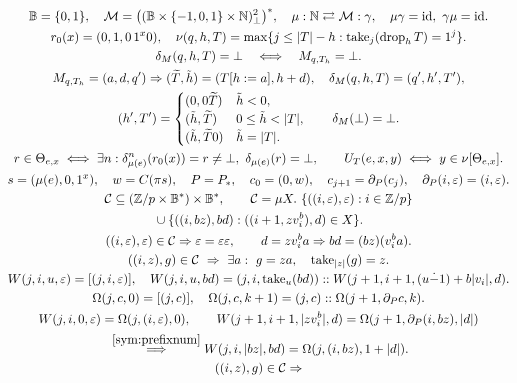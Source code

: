 \begin{gather}
\mathbb B=\{0,1\},\quad
\mathcal M=\bigl((\mathbb B\times\{-1,0,1\}\times\mathbb N)_\bot^2\bigr)^*,\quad
\mu:\mathbb N\rightleftarrows\mathcal M:\gamma,\quad
 \mu\gamma=\mathrm{id},\ \gamma\mu=\mathrm{id}.\\
r_0(x)=(0,1,0\,1^x0),\quad
\nu(q,h,T)=\max\{j\le |T|-h:\operatorname{take}_j(\operatorname{drop}_h T)=1^j\}.\\
\delta_M(q,h,T)=\bot\quad\Longleftrightarrow\quad M_{q,T_h}=\bot.\notag\\
M_{q,T_h}=(a,d,q')\Rightarrow
 (\widetilde{T},\tilde h)=(T[h:=a],h+d),\quad
 \delta_M(q,h,T)=(q',h',T'),\\
(h',T')=\begin{cases}
(0,0\widetilde T)&\tilde h<0,\\
(\tilde h,\widetilde T)&0\le\tilde h<|T|,\\
(\tilde h,\widetilde T0)&\tilde h=|T|.
\end{cases}\qquad \delta_M(\bot)=\bot .\\
r\in\Theta_{e,x}\iff\exists n:\delta_{\mu(e)}^n(r_0(x))=r\ne\bot,\
\delta_{\mu(e)}(r)=\bot,\qquad U_T(e,x,y)\iff y\in\nu[\Theta_{e,x}].\label{sym:terminalnum}\\
s=(\mu(e),0,1^x),\quad w=C(\pi s),\quad P=P_*,\quad c_0=(0,w),\quad
 c_{j+1}=\partial_P(c_j),\quad \partial_P(i,\eps)=(i,\eps).\\
\mathcal C\subseteq(\mathbb Z/p\times\mathbb B^*)\times\mathbb B^*,\qquad
\mathcal C=\mu X.\ \{((i,\eps),\eps):i\in\mathbb Z/p\}\\
{}\cup\{((i,bz),bd):((i+1,zv_i^b),d)\in X\}.\notag\\
((i,\eps),\eps)\in\mathcal C\Rightarrow \eps=\eps\eps,\qquad
d=zv_i^b a\Rightarrow bd=(bz)(v_i^b a).\\
((i,z),g)\in\mathcal C\ \Rightarrow\ \exists a:\ g=za,\quad
 \operatorname{take}_{|z|}(g)=z .\label{sym:prefixnum}\\
W(j,i,u,\eps)=[(j,i,\eps)],\quad
W(j,i,u,bd)=(j,i,\operatorname{take}_{u}(bd))::W(j+1,i+1,(u\dot-1)+b|v_i|,d).\\
\Omega(j,c,0)=[(j,c)],\quad
\Omega(j,c,k+1)=(j,c)::\Omega(j+1,\partial_Pc,k).\\
W(j,i,0,\eps)=\Omega(j,(i,\eps),0),\qquad
W(j+1,i+1,|zv_i^b|,d)=\Omega(j+1,\partial_P(i,bz),|d|)\notag\\
{}\overset{\eqref{sym:prefixnum}}{\Longrightarrow}
W(j,i,|bz|,bd)=\Omega(j,(i,bz),1+|d|).\\
((i,z),g)\in\mathcal C\Rightarrow

\end{gather}

